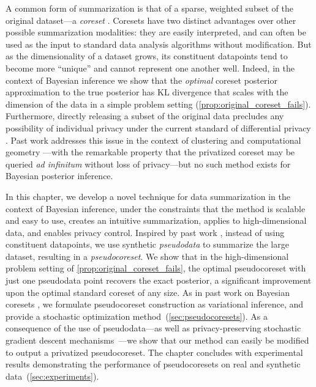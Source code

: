 A common form of summarization is that of a sparse, weighted subset of the original dataset---a \emph{coreset} \citep{agarwal05}. 
Coresets have two distinct advantages over other possible summarization modalities: they are easily interpreted, and can often be used
as the input to standard data analysis algorithms without modification. 
But as the dimensionality of a dataset grows, its constituent 
datapoints tend to become more ``unique'' and cannot represent one another well. Indeed, in the context of Bayesian inference we show that the \emph{optimal} coreset posterior approximation to the true posterior has KL divergence that scales with the dimension 
of the data in a simple problem setting (\cref{prop:original_coreset_fails}). 
Furthermore, directly releasing a subset of the original data precludes any possibility of
individual privacy under the current standard 
of differential privacy \citep{dwork2006calibrating,dwork14}. Past work
addresses this issue in the context of clustering and computational geometry \citep{feldman09,feldman17}---with
the remarkable property that the privatized coreset may be queried \emph{ad infinitum} without
loss of privacy---but no such method exists for Bayesian posterior inference.

In this chapter, we develop a novel technique for data summarization in the context of Bayesian inference, under the constraints that the method is scalable and easy to use, creates an intuitive summarization, applies to high-dimensional data, and enables privacy control. Inspired by past work \citep{madigan02,zhou08,snelson05,titsias09}, instead of using constituent datapoints, we use synthetic \emph{pseudodata} to summarize the large dataset, resulting in a \emph{pseudocoreset}. We show that in the high-dimensional problem setting of \cref{prop:original_coreset_fails}, 
the optimal pseudocoreset with just one pseudodata point recovers the exact posterior, a significant improvement upon the optimal standard coreset of any size.
As in past work on Bayesian coresets \citep{campbell19neurips}, we formulate pseudocoreset construction as variational inference, 
and provide a stochastic optimization method~(\cref{sec:pseudocoresets}). As a consequence of the use of pseudodata---as well as privacy-preserving 
stochastic gradient descent mechanisms~\citep{abadi16,park16, jalko17}---we show that our method can easily be modified to output
a privatized pseudocoreset. The chapter concludes with experimental results demonstrating the performance of pseudocoresets on 
real and synthetic data~(\cref{sec:experiments}).

